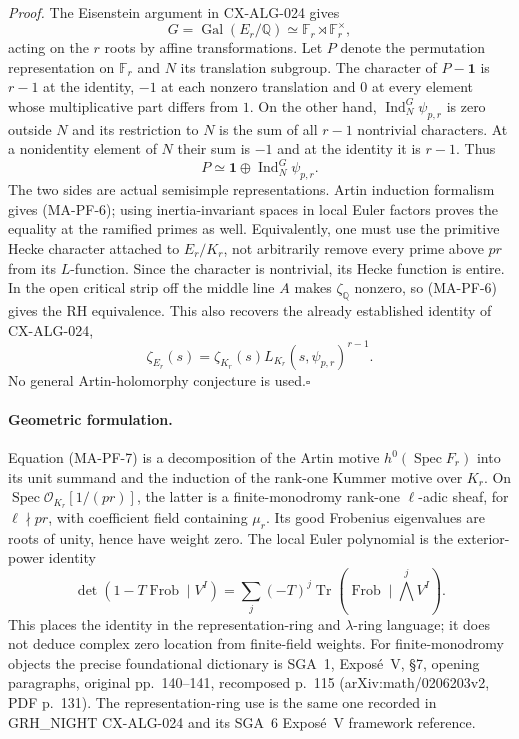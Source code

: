 \emph{Proof.} The Eisenstein argument in CX-ALG-024 gives
\[
 G=\operatorname{Gal}(E_r/\mathbb Q)
       \simeq\mathbb F_r\rtimes\mathbb F_r^\times,
\]
acting on the $r$ roots by affine transformations. Let $P$ denote the
permutation representation on $\mathbb F_r$ and $N$ its translation
subgroup. The character of $P-\boldsymbol1$ is $r-1$ at the
identity, $-1$ at each nonzero translation and $0$ at every element
whose multiplicative part differs from $1$. On the other hand,
$\operatorname{Ind}_N^G\psi_{p,r}$ is zero outside $N$ and its
restriction to $N$ is the sum of all $r-1$ nontrivial characters.
At a nonidentity element of $N$ their sum is $-1$ and at the identity
it is $r-1$. Thus
\[
   P\simeq\boldsymbol1\oplus
            \operatorname{Ind}_N^G\psi_{p,r}.
 \tag{MA-PF-7}
\]
The two sides are actual semisimple representations. Artin induction
formalism gives (MA-PF-6); using inertia-invariant spaces in local
Euler factors proves the equality at the ramified primes as well.
Equivalently, one must use the primitive Hecke character attached to
$E_r/K_r$, not arbitrarily remove every prime above $pr$ from its
$L$-function. Since the character is nontrivial, its Hecke function is
entire. In the open critical strip off the middle line $A$ makes
$\zeta_{\mathbb Q}$ nonzero, so (MA-PF-6) gives the RH equivalence.
This also recovers the already established identity of CX-ALG-024,
\[
 \zeta_{E_r}(s)=\zeta_{K_r}(s)
                     L_{K_r}(s,\psi_{p,r})^{r-1}.
 \tag{MA-PF-8}
\]
No general Artin-holomorphy conjecture is used.\hfill$\square$

\paragraph{Geometric formulation.}
Equation (MA-PF-7) is a decomposition of the Artin motive
$h^0(\operatorname{Spec}F_r)$ into its unit summand and the induction
of the rank-one Kummer motive over $K_r$. On
$\operatorname{Spec}\mathcal O_{K_r}[1/(pr)]$, the latter is a
finite-monodromy rank-one $\ell$-adic sheaf, for $\ell\nmid pr$,
with coefficient field containing $\mu_r$. Its good Frobenius
eigenvalues are roots of unity, hence have weight zero. The local
Euler polynomial is the exterior-power identity
\[
 \det(1-T\operatorname{Frob}\mid V^{I})
  =\sum_j(-T)^j\operatorname{Tr}
           (\operatorname{Frob}\mid\bigwedge^j V^{I}).
\]
This places the identity in the representation-ring and $\lambda$-ring
language; it does not deduce complex zero location from finite-field
weights. For finite-monodromy objects the precise foundational
dictionary is SGA~1, Expos\'e~V, \S7, opening paragraphs, original
pp.~140--141, recomposed p.~115 (arXiv:math/0206203v2, PDF p.~131).
The representation-ring use is the same one recorded in GRH\_NIGHT
CX-ALG-024 and its SGA~6 Expos\'e~V framework reference.

